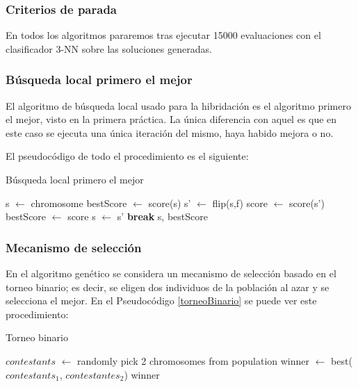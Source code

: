 \documentclass[a4paper, 11pt, titlepage]{article}
\begin{document}

    \subsubsection*{Criterios de parada}
    En todos los algoritmos pararemos tras ejecutar 15000 evaluaciones con el clasificador 3-NN sobre las soluciones generadas.

    \subsubsection*{Búsqueda local primero el mejor}
    El algoritmo de búsqueda local usado para la hibridación es el algoritmo primero el mejor, visto en la primera práctica. La única diferencia con aquel es que en este caso se ejecuta una única iteración del mismo, haya habido mejora o no.

    El pseudocódigo de todo el procedimiento es el siguiente:

    \begin{algorithm}
        \caption{Búsqueda local primero el mejor}\label{primMejor}
        \begin{algorithmic}[1]
            \State s $\gets$ chromosome
            \State bestScore $\gets$ score(s)
             
            \State s' $\gets$ flip(s,f)
            \State score $\gets$ score(s')
            \State bestScore $\gets$ score
            \State s $\gets$ s'
            \State \textbf{break}
            \EndIf
            \EndFor
            \State \Return s, bestScore
            \EndFunction
        \end{algorithmic}
    \end{algorithm}

    \subsubsection*{Mecanismo de selección}

    En el algoritmo genético se considera un mecanismo de selección basado en el torneo binario; es decir, se eligen dos individuos de la población al azar y se selecciona el mejor. En el Pseudocódigo \ref{torneoBinario} se puede ver este procedimiento:

    \begin{algorithm}
        \caption{Torneo binario}\label{torneoBinario}
        \begin{algorithmic}[1]
            \State $contestants$ $\gets$ randomly pick 2 chromosomes from population
            \State winner $\gets$ best($contestants_1$, $contestantes_2$)
            \State \Return winner
            \EndFunction
        \end{algorithmic}
    \end{algorithm}
\end{document}
